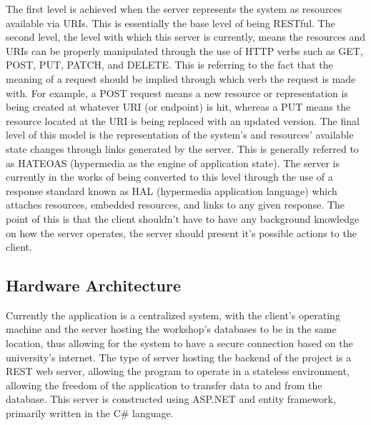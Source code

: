 {{{{{{{{The first level is achieved when the server represents the system as resources available via URIs. This is essentially the base level of being RESTful. The second level, the level with which this server is currently, means the resources and URIs can be properly manipulated through the use of HTTP verbs such as GET, POST, PUT, PATCH, and DELETE. This is referring to the fact that the meaning of a request should be implied through which verb the request is made with. For example, a POST request means a new resource or representation is being created at whatever URI (or endpoint) is hit, whereas a PUT means the resource located at the URI is being replaced with an updated version.
The final level of this model is the representation of the system’s and resources’ available state changes through links generated by the server. This is generally referred to as HATEOAS (hypermedia as the engine of application state). The server is currently in the works of being converted to this level through the use of a response standard known as HAL (hypermedia application language) which attaches resources, embedded resources, and links to any given response. The point of this is that the client shouldn’t have to have any background knowledge on how the server operates, the server should present it’s possible actions to the client.


\subsection{Hardware Architecture}
Currently the application is a centralized system, with the client's operating machine and the server hosting the workshop's databases to be in the same location, thus allowing for the system to have a secure connection based on the university's internet. The type of server hosting the backend of the project is a REST web server, allowing the program to operate in a stateless environment, allowing the freedom of the application to transfer data to and from the database. This server is constructed using ASP.NET and entity framework, primarily written in the C\# language.   

}}}}}}}}
